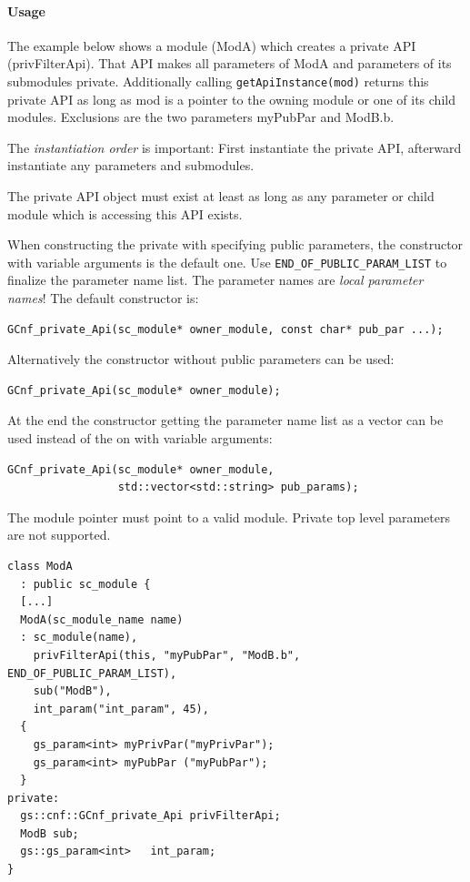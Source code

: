 \paragraph{Usage}
The example below shows a module ({\sffamily ModA}) which creates a private API ({\sffamily privFilterApi}). That API makes all parameters  of {\sffamily ModA} and parameters of its submodules private. Additionally calling \lstinline|getApiInstance(mod)| returns this private API as long as {\sffamily mod} is a pointer to the owning module or one of its child modules. Exclusions are the two parameters {\sffamily myPubPar} and {\sffamily ModB.b}.

The {\em instantiation order} is important: First instantiate the private API, afterward instantiate any parameters and submodules.

The private API object must exist at least as long as any parameter or child module which is accessing this API exists.

When constructing the private with specifying public parameters, the constructor with variable arguments is the default one. Use \lstinline|END_OF_PUBLIC_PARAM_LIST| to finalize the parameter name list. The parameter names are {\em local parameter names}! The default constructor is:
\begin{lstlisting}
GCnf_private_Api(sc_module* owner_module, const char* pub_par ...);
\end{lstlisting}

Alternatively the constructor without public parameters can be used:
\begin{lstlisting}
GCnf_private_Api(sc_module* owner_module);
\end{lstlisting}

At the end the constructor getting the parameter name list as a vector can be used instead of the on with variable arguments:
\begin{lstlisting}
GCnf_private_Api(sc_module* owner_module,
                 std::vector<std::string> pub_params);
\end{lstlisting}

The module pointer must point to a valid module. Private top level parameters are not supported.


\begin{lstlisting}
class ModA
  : public sc_module {
  [...]
  ModA(sc_module_name name)
  : sc_module(name),
    privFilterApi(this, "myPubPar", "ModB.b", END_OF_PUBLIC_PARAM_LIST),
    sub("ModB"),
    int_param("int_param", 45),
  {
    gs_param<int> myPrivPar("myPrivPar");
    gs_param<int> myPubPar ("myPubPar");
  }
private:
  gs::cnf::GCnf_private_Api privFilterApi;
  ModB sub;
  gs::gs_param<int>   int_param;
}
\end{lstlisting}

